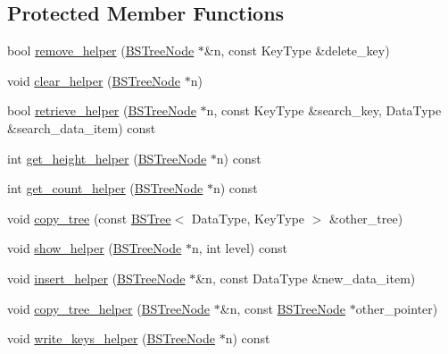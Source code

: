 \subsection*{Protected Member Functions}
\begin{DoxyCompactItemize}
\item 
bool \hyperlink{class_b_s_tree_a4bd9d8e6357091ea72da7f62e2ee9577}{remove\+\_\+helper} (\hyperlink{class_b_s_tree_1_1_b_s_tree_node}{B\+S\+Tree\+Node} $\ast$\&n, const Key\+Type \&delete\+\_\+key)
\item 
void \hyperlink{class_b_s_tree_a0c759512b61b88b824266d501beaf842}{clear\+\_\+helper} (\hyperlink{class_b_s_tree_1_1_b_s_tree_node}{B\+S\+Tree\+Node} $\ast$n)
\item 
bool \hyperlink{class_b_s_tree_ae8721d0a76719bc95e6b48420b5be302}{retrieve\+\_\+helper} (\hyperlink{class_b_s_tree_1_1_b_s_tree_node}{B\+S\+Tree\+Node} $\ast$n, const Key\+Type \&search\+\_\+key, Data\+Type \&search\+\_\+data\+\_\+item) const
\item 
int \hyperlink{class_b_s_tree_ad8a9303c63c71724cc1bba081edce42a}{get\+\_\+height\+\_\+helper} (\hyperlink{class_b_s_tree_1_1_b_s_tree_node}{B\+S\+Tree\+Node} $\ast$n) const
\item 
int \hyperlink{class_b_s_tree_a8b7d2aea1aef9e8abf213cfaaa9230ed}{get\+\_\+count\+\_\+helper} (\hyperlink{class_b_s_tree_1_1_b_s_tree_node}{B\+S\+Tree\+Node} $\ast$n) const
\item 
void \hyperlink{class_b_s_tree_a7423df4da3dd2035e681a67c321ec719}{copy\+\_\+tree} (const \hyperlink{class_b_s_tree}{B\+S\+Tree}$<$ Data\+Type, Key\+Type $>$ \&other\+\_\+tree)
\item 
void \hyperlink{class_b_s_tree_a735864f670b952c5bb2bc2550ade3a72}{show\+\_\+helper} (\hyperlink{class_b_s_tree_1_1_b_s_tree_node}{B\+S\+Tree\+Node} $\ast$n, int level) const
\item 
void \hyperlink{class_b_s_tree_a79d1cab6032e8be7484591990249c9d6}{insert\+\_\+helper} (\hyperlink{class_b_s_tree_1_1_b_s_tree_node}{B\+S\+Tree\+Node} $\ast$\&n, const Data\+Type \&new\+\_\+data\+\_\+item)
\item 
void \hyperlink{class_b_s_tree_a57b4fd45e3710cc24d63df9b80bae36d}{copy\+\_\+tree\+\_\+helper} (\hyperlink{class_b_s_tree_1_1_b_s_tree_node}{B\+S\+Tree\+Node} $\ast$\&n, const \hyperlink{class_b_s_tree_1_1_b_s_tree_node}{B\+S\+Tree\+Node} $\ast$other\+\_\+pointer)
\item 
void \hyperlink{class_b_s_tree_af3a79c41f7799cf123438f9449cf3ebb}{write\+\_\+keys\+\_\+helper} (\hyperlink{class_b_s_tree_1_1_b_s_tree_node}{B\+S\+Tree\+Node} $\ast$n) const
\end{DoxyCompactItemize}
